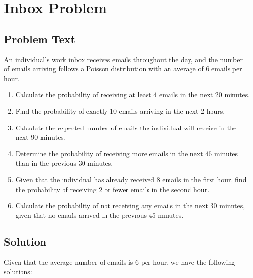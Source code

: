 \documentclass[a4paper, 10pt]{article}
\begin{document}
    \pagebreak
    \section{Inbox Problem}
        \subsection{Problem Text}
            An individual's work inbox receives emails throughout the day, and the number of emails arriving follows a Poisson distribution with an average of 6 emails per hour.

            \begin{enumerate}[label=(\alph*)]
                \item Calculate the probability of receiving at least 4 emails in the next 20 minutes.
                \item Find the probability of exactly 10 emails arriving in the next 2 hours.
                \item Calculate the expected number of emails the individual will receive in the next 90 minutes.
                \item Determine the probability of receiving more emails in the next 45 minutes than in the previous 30 minutes.
                \item Given that the individual has already received 8 emails in the first hour, find the probability of receiving 2 or fewer emails in the second hour.
                \item Calculate the probability of not receiving any emails in the next 30 minutes, given that no emails arrived in the previous 45 minutes.
            \end{enumerate}

        \subsection{Solution}
            Given that the average number of emails is 6 per hour, we have the following solutions:
\end{document}

